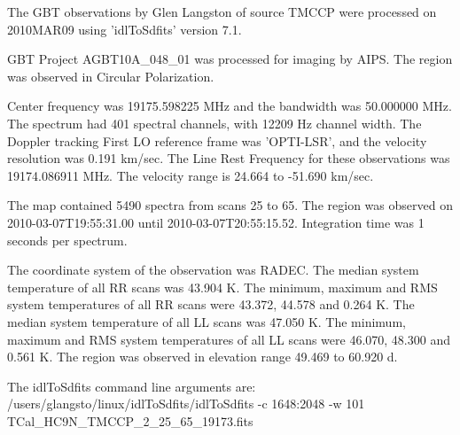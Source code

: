 The GBT observations by Glen Langston of source TMCCP
were processed on 2010MAR09 using 'idlToSdfits' version 7.1.

GBT Project AGBT10A_048_01 was processed for imaging by AIPS.
The region was observed in Circular Polarization.

Center frequency was 19175.598225 MHz and the bandwidth was 50.000000 MHz.
The spectrum had 401 spectral channels, with 12209 Hz channel width.
The Doppler tracking First LO reference frame was 'OPTI-LSR',
and the velocity resolution was 0.191 km/sec.
The Line Rest Frequency for these observations was 19174.086911 MHz.
The velocity range is 24.664 to -51.690 km/sec.

The map contained 5490 spectra from scans 25 to 65.
The region was observed on 2010-03-07T19:55:31.00 until 2010-03-07T20:55:15.52.
Integration time was 1 seconds per spectrum.

The coordinate system of the observation was RADEC.
The median system temperature of all RR scans was 43.904 K.
The minimum, maximum and RMS system temperatures of 
all RR scans were 43.372, 44.578 and 0.264 K.
The median system temperature of all LL scans was 47.050 K.
The minimum, maximum and RMS system temperatures of 
all LL scans were 46.070, 48.300 and 0.561 K.
The region was observed in elevation range 49.469 to 60.920 d.

The idlToSdfits command line arguments are:
/users/glangsto/linux/idlToSdfits/idlToSdfits -c 1648:2048 -w 101 TCal_HC9N_TMCCP_2_25_65_19173.fits 
